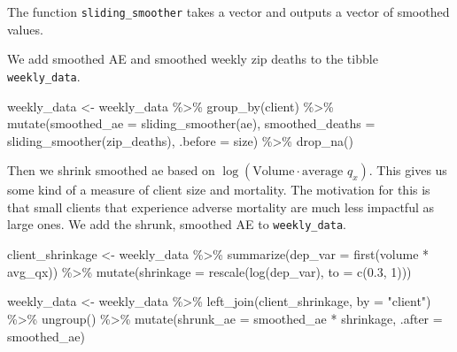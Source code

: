 \documentclass[
]{article}
\newenvironment{Shaded}{\begin{snugshade}}{\end{snugshade}}
\newcommand{\AttributeTok}[1]{\textcolor[rgb]{0.77,0.63,0.00}{#1}}
\newcommand{\DecValTok}[1]{\textcolor[rgb]{0.00,0.00,0.81}{#1}}
\newcommand{\FloatTok}[1]{\textcolor[rgb]{0.00,0.00,0.81}{#1}}
\newcommand{\FunctionTok}[1]{\textcolor[rgb]{0.00,0.00,0.00}{#1}}
\newcommand{\NormalTok}[1]{#1}
\newcommand{\OtherTok}[1]{\textcolor[rgb]{0.56,0.35,0.01}{#1}}
\newcommand{\SpecialCharTok}[1]{\textcolor[rgb]{0.00,0.00,0.00}{#1}}
\newcommand{\StringTok}[1]{\textcolor[rgb]{0.31,0.60,0.02}{#1}}
\begin{document}
The function \texttt{sliding\_smoother} takes a vector and outputs a
vector of smoothed values.

We add smoothed AE and smoothed weekly zip deaths to the tibble
\texttt{weekly\_data}.

\begin{Shaded}
\begin{Highlighting}[]
\NormalTok{weekly\_data }\OtherTok{\textless{}{-}}
\NormalTok{  weekly\_data }\SpecialCharTok{\%\textgreater{}\%}
  \FunctionTok{group\_by}\NormalTok{(client) }\SpecialCharTok{\%\textgreater{}\%}
  \FunctionTok{mutate}\NormalTok{(}\AttributeTok{smoothed\_ae =} \FunctionTok{sliding\_smoother}\NormalTok{(ae), }
      \AttributeTok{smoothed\_deaths =} \FunctionTok{sliding\_smoother}\NormalTok{(zip\_deaths), }\AttributeTok{.before =}\NormalTok{ size) }\SpecialCharTok{\%\textgreater{}\%}
  \FunctionTok{drop\_na}\NormalTok{()}
\end{Highlighting}
\end{Shaded}

Then we shrink smoothed ae based on
\(\log(\text{Volume} \cdot \text{average } q_x)\). This gives us some
kind of a measure of client size and mortality. The motivation for this
is that small clients that experience adverse mortality are much less
impactful as large ones. We add the shrunk, smoothed AE to
\texttt{weekly\_data}.

\begin{Shaded}
\begin{Highlighting}[]
\NormalTok{client\_shrinkage }\OtherTok{\textless{}{-}}
\NormalTok{  weekly\_data }\SpecialCharTok{\%\textgreater{}\%}
  \FunctionTok{summarize}\NormalTok{(}\AttributeTok{dep\_var =} \FunctionTok{first}\NormalTok{(volume }\SpecialCharTok{*}\NormalTok{ avg\_qx)) }\SpecialCharTok{\%\textgreater{}\%}
  \FunctionTok{mutate}\NormalTok{(}\AttributeTok{shrinkage =} \FunctionTok{rescale}\NormalTok{(}\FunctionTok{log}\NormalTok{(dep\_var), }\AttributeTok{to =} \FunctionTok{c}\NormalTok{(}\FloatTok{0.3}\NormalTok{, }\DecValTok{1}\NormalTok{)))}

\NormalTok{weekly\_data }\OtherTok{\textless{}{-}}
\NormalTok{  weekly\_data }\SpecialCharTok{\%\textgreater{}\%}
  \FunctionTok{left\_join}\NormalTok{(client\_shrinkage, }\AttributeTok{by =} \StringTok{"client"}\NormalTok{) }\SpecialCharTok{\%\textgreater{}\%}
  \FunctionTok{ungroup}\NormalTok{() }\SpecialCharTok{\%\textgreater{}\%}
  \FunctionTok{mutate}\NormalTok{(}\AttributeTok{shrunk\_ae =}\NormalTok{ smoothed\_ae }\SpecialCharTok{*}\NormalTok{ shrinkage, }\AttributeTok{.after =}\NormalTok{ smoothed\_ae)}
\end{Highlighting}
\end{Shaded}
\end{document}
